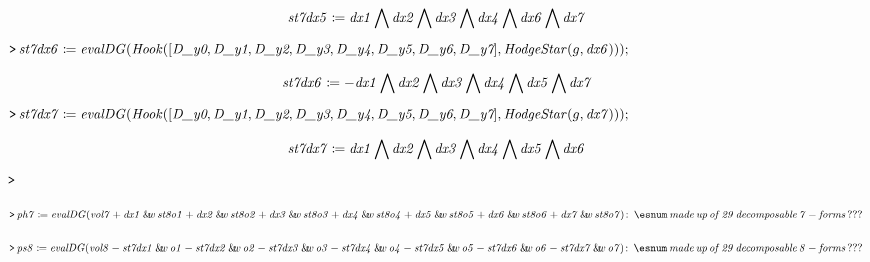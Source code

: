 \documentclass{article}
\begin{document}
\begin{dmath}\label{(29)}
\mathit{st7dx5} \coloneqq 
\\
\mathit{dx1} \bigwedge  \mathit{dx2}  \bigwedge  \mathit{dx3}  \bigwedge  \mathit{dx4}  
\\
\bigwedge  \mathit{dx6} 
\\
 \bigwedge  \mathit{dx7} 
\end{dmath}
\mapleinput
{$ \displaystyle \texttt{>\,} \mathit{st7dx6} \coloneqq \mathit{evalDG} (\mathit{Hook} ([\textit{D\_y0} ,\textit{D\_y1} ,\textit{D\_y2} ,\textit{D\_y3} ,\textit{D\_y4} ,\textit{D\_y5} ,\textit{D\_y6} ,\textit{D\_y7}],\mathit{HodgeStar} (g ,\mathit{dx6})));\, $}

\begin{dmath}\label{(30)}
\mathit{st7dx6} \coloneqq -\mathit{dx1} \bigwedge  \mathit{dx2}  \bigwedge  \mathit{dx3}  \bigwedge  \mathit{dx4}  \bigwedge  \mathit{dx5} 
\\
 \bigwedge  \mathit{dx7} 
\end{dmath}
\mapleinput
{$ \displaystyle \texttt{>\,} \mathit{st7dx7} \coloneqq \mathit{evalDG} (\mathit{Hook} ([\textit{D\_y0} ,\textit{D\_y1} ,\textit{D\_y2} ,\textit{D\_y3} ,\textit{D\_y4} ,\textit{D\_y5} ,\textit{D\_y6} ,\textit{D\_y7}],\mathit{HodgeStar} (g ,\mathit{dx7})));\, $}

\begin{dmath}\label{(31)}
\mathit{st7dx7} \coloneqq 
\\
\mathit{dx1} \bigwedge  \mathit{dx2}  \bigwedge  \mathit{dx3}  \bigwedge  \mathit{dx4}  
\\
\bigwedge  \mathit{dx5} 
\\
 \bigwedge  \mathit{dx6} 
\end{dmath}
\mapleinput
{$ \displaystyle \texttt{>\,} \, $}

\mapleinput
{$ \displaystyle \texttt{>\,} \mathit{ph7} \coloneqq \mathit{evalDG} (\mathit{vol7} +\mathit{dx1} \:\&\!\!w \,\mathit{st8o1} +\mathit{dx2} \:\&\!\!w \,\mathit{st8o2} +\mathit{dx3} \:\&\!\!w \,\mathit{st8o3} +\mathit{dx4} \:\&\!\!w \,\mathit{st8o4} +\mathit{dx5} \:\&\!\!w \,\mathit{st8o5} +\mathit{dx6} \:\&\!\!w \,\mathit{st8o6} +\mathit{dx7} \:\&\!\!w \,\mathit{st8o7})\colon \,\esnum \mathit{\,made\,up\,of\,29\,decomposable\,7-forms\,???\,}  $}

\mapleinput
{$ \displaystyle \texttt{>\,} \mathit{ps8} \coloneqq \mathit{evalDG} (\mathit{vol8} -\mathit{st7dx1} \:\&\!\!w \,\mathit{o1} -\mathit{st7dx2} \:\&\!\!w \,\mathit{o2} -\mathit{st7dx3} \:\&\!\!w \,\mathit{o3} -\mathit{st7dx4} \:\&\!\!w \,\mathit{o4} -\mathit{st7dx5} \:\&\!\!w \,\mathit{o5} -\mathit{st7dx6} \:\&\!\!w \,\mathit{o6} -\mathit{st7dx7} \:\&\!\!w \,\mathit{o7})\colon \,\esnum \mathit{\,made\,up\,of\,29\,decomposable\,8-forms\,???\,}  $}
\end{document}
